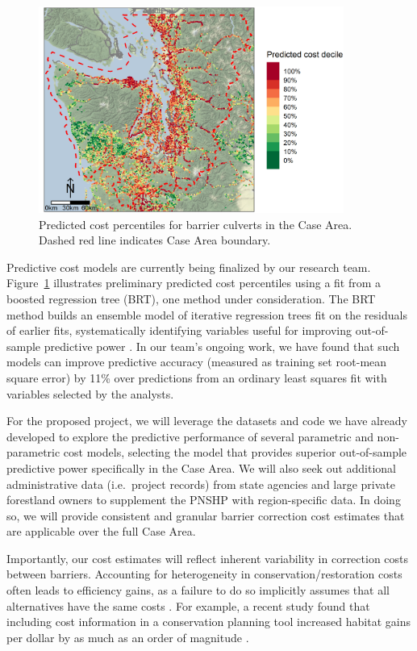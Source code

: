 \begin{figure}
	\centering
	\includegraphics[width=10cm]{figures/predCost.png}
	\caption{Predicted cost percentiles for barrier culverts in the Case Area. Dashed red line indicates Case Area boundary.\label{fig:cost}}
\end{figure}%


Predictive cost models are currently being finalized by our research team. Figure~\ref{fig:cost} illustrates preliminary predicted cost percentiles using a fit from a boosted regression tree (BRT), one method under consideration. The BRT method builds an ensemble model of iterative regression trees fit on the residuals of earlier fits, systematically identifying variables useful for improving out-of-sample predictive power \citep{elith_working_2008}. In our team's ongoing work, we have found that such models can improve predictive accuracy (measured as training set root-mean square error) by 11\% over predictions from an ordinary least squares fit with variables selected by the analysts. 

For the proposed project, we will leverage the datasets and code we have already developed to explore the predictive performance of several parametric and non-parametric cost models, selecting the model that provides superior out-of-sample predictive power specifically in the Case Area. We will also seek out additional administrative data (i.e.\ project records) from state agencies and large private forestland owners to supplement the PNSHP with region-specific data. In doing so, we will provide consistent and granular barrier correction cost estimates that are applicable over the full Case Area. 

Importantly, our cost estimates will reflect inherent variability in correction costs between barriers. Accounting for heterogeneity in conservation/restoration costs often leads to efficiency gains, as a failure to do so implicitly assumes that all alternatives have the same costs \citep{babcock_targeting_1997}. For example, a recent study found that including cost information in a conservation planning tool increased habitat gains per dollar by as much as an order of magnitude \citep{field_quantifying_2019}. 

